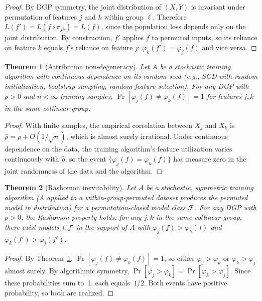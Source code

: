 \documentclass{article}
\newtheorem{theorem}{Theorem}
\begin{document}
\begin{proof}
By DGP symmetry, the joint distribution of $(X, Y)$ is invariant
under permutation of features $j$ and $k$ within group $\ell$.
Therefore $L(f') = L(f \circ \pi_{jk}) = L(f)$, since the
population loss depends only on the joint distribution.
By construction, $f'$ applies $f$ to permuted inputs, so its
reliance on feature $k$ equals $f$'s reliance on feature $j$:
$\varphi_k(f') = \varphi_j(f)$ and vice versa.
\end{proof}

\begin{theorem}[Attribution non-degeneracy]
\label{thm:non-degeneracy}
Let $A$ be a stochastic training algorithm with continuous dependence
on its random seed (e.g., SGD with random initialization, bootstrap
sampling, random feature selection). For any DGP with $\rho > 0$ and
$n < \infty$ training samples, $\Pr[\varphi_j(f) \neq \varphi_k(f)] = 1$
for features $j, k$ in the same collinear group.
\end{theorem}

\begin{proof}
With finite samples, the empirical correlation between $X_j$ and $X_k$
is $\hat\rho = \rho + O(1/\sqrt{n})$, which is almost surely irrational.
Under continuous dependence on the data, the training algorithm's feature
utilization varies continuously with $\hat\rho$, so the event
$\{\varphi_j(f) = \varphi_k(f)\}$ has measure zero in the joint
randomness of the data and the algorithm.
\end{proof}

\begin{theorem}[Rashomon inevitability]
\label{thm:rashomon-inevitability}
Let $A$ be a stochastic, symmetric training algorithm
($A$ applied to a within-group-permuted dataset produces the
permuted model in distribution) for a permutation-closed model class
$\mathcal{F}$. For any DGP with $\rho > 0$, the Rashomon property
holds: for any $j, k$ in the same collinear group, there exist
models $f, f'$ in the support of $A$ with $\varphi_j(f) > \varphi_k(f)$
and $\varphi_k(f') > \varphi_j(f')$.
\end{theorem}

\begin{proof}
By Theorem~\ref{thm:non-degeneracy},
$\Pr[\varphi_j(f) \neq \varphi_k(f)] = 1$, so either
$\varphi_j > \varphi_k$ or $\varphi_k > \varphi_j$ almost surely.
By algorithmic symmetry,
$\Pr[\varphi_j > \varphi_k] = \Pr[\varphi_k > \varphi_j]$.
Since these probabilities sum to~1, each equals~$1/2$.
Both events have positive probability, so both are realized.
\end{proof}
\end{document}
